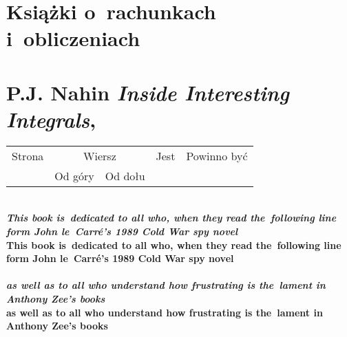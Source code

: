 \documentclass[a4paper,11pt]{article}
\numberwithin{equation}{section}
\begin{document}
\VerSpaceTwo
















\newpage

\section{Książki o~rachunkach i~obliczeniach}

\VerSpaceTwo



\section{P.J. Nahin \textit{Inside Interesting Integrals},
  \cite{NahinInterestingIntegrals2015}}

\vspace{0em}




\begin{center}

  \begin{tabular}{|c|c|c|c|c|}
    \hline
    Strona & \multicolumn{2}{c|}{Wiersz} & Jest
                              & Powinno być \\ \cline{2-3}
    & Od góry & Od dołu & & \\
    \hline
    \hline
  \end{tabular}

\end{center}

\VerSpaceTwo


\noindent
{} \\
\Jest \textbf{\textit{This book is~dedicated to all who, when they read
    the~following line form John le~Carr\'{e}'s 1989 Cold War spy
    novel}} \\
\PowinnoByc \textbf{This book is~dedicated to all who, when they read
  the~following line form John le~Carr\'{e}'s 1989 Cold War spy
  novel} \\
 \\
\Jest \textbf{\textit{as well as to all who understand how frustrating is
    the~lament in Anthony Zee's books}} \\
\PowinnoByc \textbf{as well as to all who understand how frustrating is
  the~lament in Anthony Zee's books} \\













\printbibliography





\end{document}

